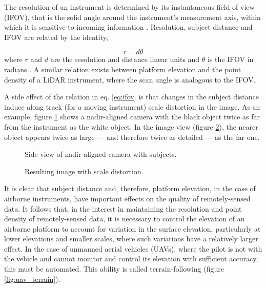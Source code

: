 \documentclass[10pt,a4paper]{report}
\begin{document}
The resolution of an instrument is determined by its instantaneous field of view (IFOV), that is the solid angle around the instrument's measurement axis, within which it is sensitive to incoming information \cite{Lillesand1999}. Resolution, subject distance and IFOV are related by the identity, 

\begin{equation}
r = d \theta
\label{eq:ifov}
\end{equation} 
where $r$ and $d$ are the resolution and distance linear units and $\theta$ is the IFOV in radians \cite{Lillesand1999}. A similar relation exists between platform elevation and the point density of a LiDAR instrument, where the scan angle is analogous to the IFOV. 

A side effect of the relation in eq. \ref{eq:ifov} is that changes in the subject distance induce along track (for a moving instrument) scale distortion in the image. As an example, figure \ref{fig:scale_cam} shows a nadir-aligned camera with the black object twice as far from the instrument as the white object. In the image view (figure \ref{fig:scale_img}), the nearer object appears twice as large --- and therefore twice as detailed --- as the far one. 

\begin{figure}
\centering
\def\svgscale{0.5}

\caption{Side view of nadir-aligned camera with subjects.}
\label{fig:scale_cam}
\end{figure}

\begin{figure}
\centering
\def\svgscale{0.5}

\caption{Resulting image with scale distortion.}
\label{fig:scale_img}
\end{figure}

It is clear that subject distance and, therefore, platform elevation, in the case of airborne instruments, have important effects on the quality of remotely-sensed data. It follows that, in the interest in maintaining the resolution and point density of remotely-sensed data, it is necessary to control the elevation of an airborne platform to account for variation in the surface elevation, particularly at lower elevations and smaller scales, where such variations have a relatively larger effect. In the case of unmanned aerial vehicles (UAVs), where the pilot is not with the vehicle and cannot monitor and control its elevation with sufficient accuracy, this must be automated. This ability is called terrain-following (figure \ref{fig:uav_terrain}).
\end{document}
